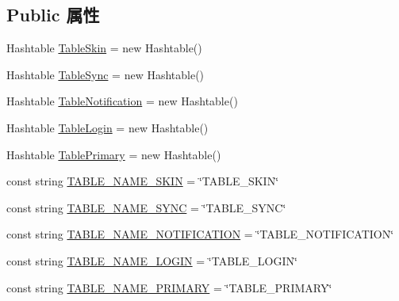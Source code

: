 \subsection*{Public 属性}
\begin{DoxyCompactItemize}
\item 
Hashtable \hyperlink{classcustom__cloud_1_1_my_config_1_1_config_file_a26b76ced6a65d96d2f355681c16a4ec7}{Table\+Skin} = new Hashtable()
\item 
Hashtable \hyperlink{classcustom__cloud_1_1_my_config_1_1_config_file_a2fbd02f1222a0e986b70b7d47ebc0071}{Table\+Sync} = new Hashtable()
\item 
Hashtable \hyperlink{classcustom__cloud_1_1_my_config_1_1_config_file_a2265fa5cfed3f0380800ba50bb955974}{Table\+Notification} = new Hashtable()
\item 
Hashtable \hyperlink{classcustom__cloud_1_1_my_config_1_1_config_file_a026665805f6dfa799564fc49cd3ff97b}{Table\+Login} = new Hashtable()
\item 
Hashtable \hyperlink{classcustom__cloud_1_1_my_config_1_1_config_file_a39176fb9c4540ac499b49112bef5fe73}{Table\+Primary} = new Hashtable()
\item 
const string \hyperlink{classcustom__cloud_1_1_my_config_1_1_config_file_a9b56d5ff54b56f79ddb19bead5cfb8fd}{T\+A\+B\+L\+E\+\_\+\+N\+A\+M\+E\+\_\+\+S\+K\+IN} = \char`\"{}T\+A\+B\+L\+E\+\_\+\+S\+K\+IN\char`\"{}
\item 
const string \hyperlink{classcustom__cloud_1_1_my_config_1_1_config_file_aa97db019e2934feb570c35cf772d7357}{T\+A\+B\+L\+E\+\_\+\+N\+A\+M\+E\+\_\+\+S\+Y\+NC} = \char`\"{}T\+A\+B\+L\+E\+\_\+\+S\+Y\+NC\char`\"{}
\item 
const string \hyperlink{classcustom__cloud_1_1_my_config_1_1_config_file_a8a2f8be0b8e9afbad85983040e838988}{T\+A\+B\+L\+E\+\_\+\+N\+A\+M\+E\+\_\+\+N\+O\+T\+I\+F\+I\+C\+A\+T\+I\+ON} = \char`\"{}T\+A\+B\+L\+E\+\_\+\+N\+O\+T\+I\+F\+I\+C\+A\+T\+I\+ON\char`\"{}
\item 
const string \hyperlink{classcustom__cloud_1_1_my_config_1_1_config_file_a9a060425d4093164b54bcb932ca02d59}{T\+A\+B\+L\+E\+\_\+\+N\+A\+M\+E\+\_\+\+L\+O\+G\+IN} = \char`\"{}T\+A\+B\+L\+E\+\_\+\+L\+O\+G\+IN\char`\"{}
\item 
const string \hyperlink{classcustom__cloud_1_1_my_config_1_1_config_file_aa4ef6eb0b3333680028130c8acf49542}{T\+A\+B\+L\+E\+\_\+\+N\+A\+M\+E\+\_\+\+P\+R\+I\+M\+A\+RY} = \char`\"{}T\+A\+B\+L\+E\+\_\+\+P\+R\+I\+M\+A\+RY\char`\"{}
\end{DoxyCompactItemize}



